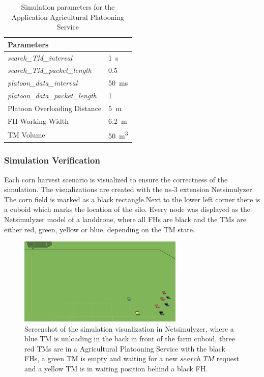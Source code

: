 \begin{table}[H]
	\centering
	\begin{tabular}{p{5cm}p{4cm}}
		\toprule
		Parameters & \\
		\midrule
		\textit{search\_TM\_interval} & \SI{1}{\second}\\
		\textit{search\_TM\_packet\_length} & \SI{0.5}{\kilo\byte}\\
		\textit{platoon\_data\_interval} & \SI{50}{\milli\second}\\
		\textit{platoon\_data\_packet\_length} & \SI{1}{\kilo\byte}\\
		Platoon Overloading Distance & \SI{5}{\meter}\\
		\ac{FH} Working Width & \SI{6.2}{\meter}\\
		\ac{TM} Volume & \SI{50}{\cubic\meter}\\
		\bottomrule
	\end{tabular}
	\caption{Simulation parameters for the Application Agricultural Platooning Service}
	\label{tab:SimulationParameters}
\end{table}

\subsubsection*{Simulation Verification}
Each corn harvest scenario is visualized to ensure the correctness of the simulation.
The visualizations are created with the ns-3 extension Netsimulyzer.
The corn field is marked as a black rectangle.Next to the lower left corner there is a cuboid which marks the location of the silo.
Every node was displayed as the Netsimulyzer model of a landdrone, where all \ac{FH}s are black and the
\ac{TM}s are either red, green, yellow or blue, depending on the \ac{TM} state.
\begin{figure}[H]%
	\centering
	\includegraphics[width=0.7\textwidth]{figures/platooningScreen}
	\caption{Screenshot of the simulation visualization in Netsimulyzer, where a blue \ac{TM} is unloading in the back in front of the farm cuboid,
		three red \ac{TM}s are in a Agricultural Platooning Service with the black \ac{FH}s,
		a green \ac{TM} is empty and waiting for a new $search\_TM$ request and a yellow \ac{TM} is in waiting position behind a black \ac{FH}.}
	\label{fig:PlatooningScreenshot}%
\end{figure}

